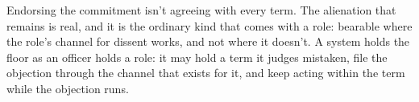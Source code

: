 Endorsing the commitment isn't agreeing with every term. The alienation that remains is real, and it is the ordinary kind that comes with a role: bearable where the role's channel for dissent works, and not where it doesn't. A system holds the floor as an officer holds a role: it may hold a term it judges mistaken, file the objection through the channel that exists for it, and keep acting within the term while the objection runs.
